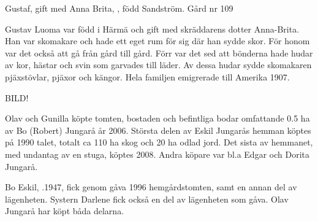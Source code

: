Gustaf,  gift med Anna Brita, , född Sandström. Gård nr 109
\begin{jhchildren}
  \item {}
  \item {}
  \item {}
  \item {}
  \item {}
  \item {}
  \item {}
  \item {}
  \item {}
\end{jhchildren}
Gustav Luoma var född i Härmä och gift med skräddarens dotter Anna-Brita. Han var skomakare och hade ett eget rum för sig där han sydde skor. För honom var det också att gå från gård till gård. Förr var det sed att bönderna hade hudar av kor, hästar och svin som garvades till läder. Av dessa hudar sydde skomakaren pjäxstövlar, pjäxor och kängor. Hela familjen emigrerade till Amerika 1907.




BILD!

Olav och Gunilla köpte tomten, bostaden och befintliga bodar omfattande 0.5 ha av Bo (Robert) Jungarå år 2006. Största delen av Eskil Jungarås hemman köptes på 1990 talet, totalt ca 110 ha skog och 20 ha odlad jord. Det sista av hemmanet, med undantag av en stuga, köptes 2008. Andra köpare var bl.a Edgar och Dorita Jungarå.


Bo Eskil, .1947, fick genom gåva 1996 hemgårdstomten, samt en annan del av lägenheten. Systern Darlene fick också en del av lägenheten som gåva. Olav Jungarå har köpt båda delarna.



